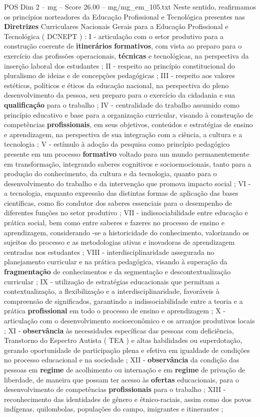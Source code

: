 \begin{textsample}{POS Dim 2 – mg – Score 26.00 – mg/mg\_em\_105.txt}
Neste sentido, reafirmamos os princípios norteadores da Educação Profissional e Tecnológica presentes nas \textbf{Diretrizes} Curriculares Nacionais Gerais para a Educação Profissional e Tecnológica ( DCNEPT ) : I - articulação com o setor produtivo para a construção coerente de \textbf{itinerários} \textbf{formativos}, com vista ao preparo para o exercício das profissões operacionais, \textbf{técnicas} e tecnológicas, na perspectiva da inserção laboral dos estudantes ; II - respeito ao princípio constitucional do pluralismo de ideias e de concepções pedagógicas ; III - respeito aos valores estéticos, políticos e éticos da educação nacional, na perspectiva do pleno desenvolvimento da pessoa, seu preparo para o exercício da cidadania e sua \textbf{qualificação} para o trabalho ; IV - centralidade do trabalho assumido como princípio educativo e base para a organização curricular, visando à construção de competências \textbf{profissionais}, em seus objetivos, conteúdos e estratégias de ensino e aprendizagem, na perspectiva de sua integração com a ciência, a cultura e a tecnologia ; V - estímulo à adoção da pesquisa como princípio pedagógico presente em um processo \textbf{formativo} voltado para um mundo permanentemente em transformação, integrando saberes cognitivos e socioemocionais, tanto para a produção do conhecimento, da cultura e da tecnologia, quanto para o desenvolvimento do trabalho e da intervenção que promova impacto social ; VI - a tecnologia, enquanto expressão das distintas formas de aplicação das bases científicas, como fio condutor dos saberes essenciais para o desempenho de diferentes funções no setor produtivo ; VII - indissociabilidade entre educação e prática social, bem como entre saberes e fazeres no processo de ensino e aprendizagem, considerando -se a historicidade do conhecimento, valorizando os sujeitos do processo e as metodologias ativas e inovadoras de aprendizagem centradas nos estudantes ; VIII - interdisciplinaridade assegurada no planejamento curricular e na prática pedagógica, visando à superação da \textbf{fragmentação} de conhecimentos e da segmentação e descontextualização curricular ; IX - utilização de estratégias educacionais que permitam a contextualização, a flexibilização e a interdisciplinaridade, favoráveis à compreensão de significados, garantindo a indissociabilidade entre a teoria e a prática \textbf{profissional} em todo o processo de ensino e aprendizagem ; X - articulação com o desenvolvimento socioeconômico e os arranjos produtivos locais ; XI - \textbf{observância} às necessidades específicas das pessoas com deficiência, Transtorno do Espectro Autista ( TEA ) e altas habilidades ou superdotação, gerando oportunidade de participação plena e efetiva em igualdade de condições no processo educacional e na sociedade ; XII - \textbf{observância} da condição das pessoas em \textbf{regime} de acolhimento ou internação e em \textbf{regime} de privação de liberdade, de maneira que possam ter acesso às \textbf{ofertas} educacionais, para o desenvolvimento de competências \textbf{profissionais} para o trabalho ; XIII - reconhecimento das identidades de gênero e étnico-raciais, assim como dos povos indígenas, quilombolas, populações do campo, imigrantes e itinerantes ; 
\end{textsample}
